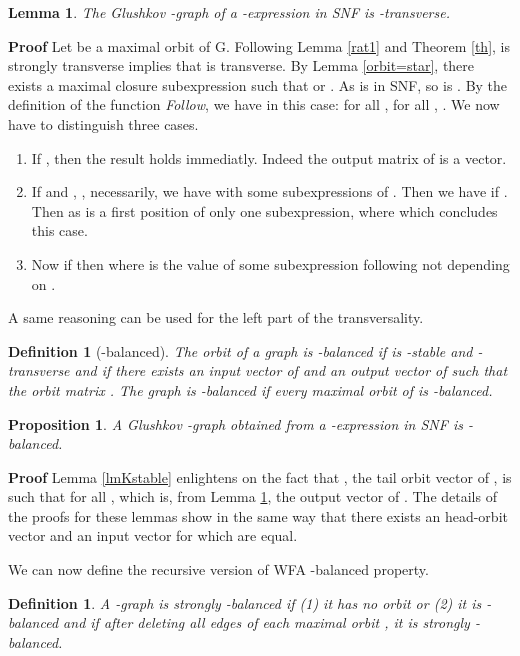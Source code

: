 \documentclass[11pt]{article}
\newtheorem{proposition}[theorem]{Proposition}
\newtheorem{definition}[theorem]{Definition}
\newtheorem{lemma}[theorem]{Lemma}
\begin{document}
\begin{lemma}\label{lmKtransverse}
The Glushkov -graph  of a -expression  in SNF is -transverse.
\end{lemma}
{\bf Proof }
Let  be a maximal orbit of G.  Following Lemma \ref{rat1} and Theorem \ref{th},  is strongly transverse implies that  is transverse. By Lemma  \ref{orbit=star}, there exists a maximal closure subexpression  such that  or . As  is in SNF, so is . By the definition of the function {\it Follow}, we have in this case: for all , for all , . We now have to distinguish three cases. 
\begin{enumerate}
\item If , then the result holds immediatly. Indeed the output matrix of  is a vector.
\item If  and , , necessarily, we have  with  some subexpressions of . Then we have  if . Then as  is a first position of only one subexpression,   where  which concludes this case.
\item Now if  then  where  is the  value of some subexpression following  not depending on .
\end{enumerate}
 A same reasoning can be used for the left part of the transversality. \cqfd 
 
 \begin{definition}[-balanced]
The orbit  of a graph  is -balanced if   is -stable and  -transverse and if there exists  an input vector  of  and  an output vector  of  such that the orbit matrix . The graph  is -balanced if every maximal orbit of  is -balanced.
\end{definition}

\begin{proposition}\label{Kbal}
A Glushkov -graph obtained from a -expression  in SNF is -balanced. 
\end{proposition}
{\bf Proof }
 Lemma  \ref{lmKstable} enlightens on the fact that , the tail orbit vector of , is  such that  for all , which is, from Lemma  \ref{lmKtransverse}, the output vector of .
The details of the proofs for these lemmas show in the same way that there exists an  head-orbit vector and an  input vector for    which are equal.
\cqfd

We can now define the recursive version of WFA -balanced property.

\begin{definition}
A -graph is strongly -balanced  if (1) it has no orbit or (2) it is -balanced and if after deleting all edges  of each maximal orbit , it is strongly -balanced.
\end{definition}
\end{document}
